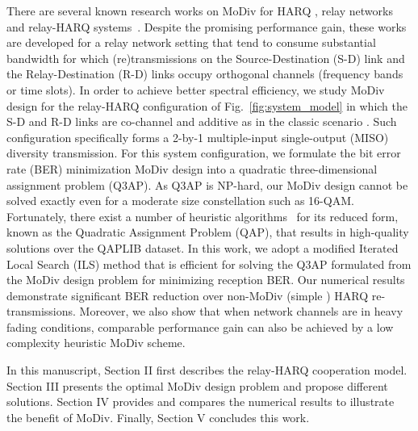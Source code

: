 \documentclass[journal]{IEEEtran}
\begin{document}
There are several known research works on MoDiv for HARQ
\cite{harvind2005symbol}, relay networks~\cite{seddik2008trans,
khormuji2008rate} and relay-HARQ systems~\cite{kim2009design, ryu2011ber}.
Despite the promising performance gain, these works are developed for a relay
network setting that tend to consume substantial bandwidth for which
(re)transmissions on the Source-Destination (S-D) link and the Relay-Destination
(R-D) links occupy orthogonal channels (frequency bands or time slots). In order
to achieve better spectral efficiency, we study MoDiv design for the relay-HARQ
configuration of Fig.~\ref{fig:system_model} in which the S-D and R-D links are
co-channel and additive as in the classic scenario \cite{cover1979capacity,
nabar2004fading}. Such configuration specifically forms a 2-by-1
multiple-input single-output (MISO) diversity transmission.
For this system configuration, we formulate the bit error rate (BER)
minimization MoDiv design into a quadratic three-dimensional assignment problem (Q3AP). 
As Q3AP is NP-hard, our MoDiv design cannot be solved exactly 
even for a moderate size constellation such as 16-QAM. Fortunately, there exist
a number of heuristic algorithms~\cite{benlic2015memetic} for its reduced form,
known as the Quadratic Assignment Problem (QAP), that results in high-quality
solutions over the QAPLIB dataset. In this work, we adopt a modified Iterated
Local Search (ILS) method that is efficient for solving the Q3AP formulated from
the MoDiv design problem for minimizing reception BER. Our numerical results
demonstrate significant BER reduction over non-MoDiv (simple ) HARQ re-transmissions.
Moreover, we also show that when network channels are in heavy fading
conditions, comparable performance gain can also be achieved by a low complexity
heuristic MoDiv scheme.

In this manuscript, Section II first describes the relay-HARQ cooperation model.
Section III presents the optimal MoDiv design problem and propose different
solutions. Section IV provides and compares the numerical results to illustrate
the benefit of MoDiv. Finally, Section V concludes this work. 
\end{document}
